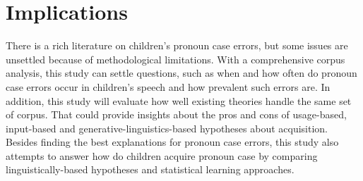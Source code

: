 \section{Implications}

There is a rich literature on children's pronoun case errors, but some issues are unsettled because of methodological limitations. With a comprehensive corpus analysis, this study can settle questions, such as when and how often do pronoun case errors occur in children's speech and how prevalent such errors are. In addition, this study will evaluate how well existing theories handle the same set of corpus. That could provide insights about the pros and cons of usage-based, input-based and generative-linguistics-based hypotheses about acquisition. Besides finding the best explanations for pronoun case errors, this study also attempts to answer how do children acquire pronoun case by comparing linguistically-based hypotheses and statistical learning approaches. 
